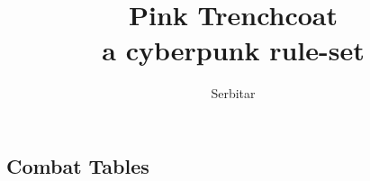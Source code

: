 \documentclass[10pt, a4paper,twocolumn, oneside]{book}
\title{Pink Trenchcoat \\ \small{a cyberpunk rule-set}}
\author{Serbitar}
\begin{document}
\maketitle

\tableofcontents







\cleardoublepage
{}
\listoftables
\listoffigures
{}
\printindex

\begin{appendix}
    \chapter{Combat Tables}

    \onecolumn


    \begin{table}[htb]
        \begin{minipage}[b]{0.5\linewidth}
        \end{minipage}
    \end{table}


\end{appendix}
\end{document}
